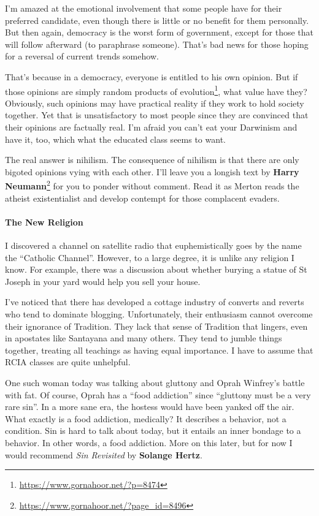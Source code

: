 I'm amazed at the emotional involvement that some people have for their preferred candidate, even though there is little or no benefit for them personally. But then again, democracy is the worst form of government, except for those that will follow afterward (to paraphrase someone). That's bad news for those hoping for a reversal of current trends somehow.

That's because in a democracy, everyone is entitled to his own opinion. But if those opinions are simply random products of evolution\footnote{\url{https://www.gornahoor.net/?p=8474}}, what value have they? Obviously, such opinions may have practical reality if they work to hold society together. Yet that is unsatisfactory to most people since they are convinced that their opinions are factually real. I'm afraid you can't eat your Darwinism and have it, too, which what the educated class seems to want.

The real answer is nihilism. The consequence of nihilism is that there are only bigoted opinions vying with each other. I'll leave you a longish text by \textbf{Harry Neumann}\footnote{\url{https://www.gornahoor.net/?page_id=8496}} for you to ponder without comment. Read it as Merton reads the atheist existentialist and develop contempt for those complacent evaders.

\paragraph{The New Religion}


I discovered a channel on satellite radio that euphemistically goes by the name the ``Catholic Channel''. However, to a large degree, it is unlike any religion I know. For example, there was a discussion about whether burying a statue of St Joseph in your yard would help you sell your house.

I've noticed that there has developed a cottage industry of converts and reverts who tend to dominate blogging. Unfortunately, their enthusiasm cannot overcome their ignorance of Tradition. They lack that sense of Tradition that lingers, even in apostates like Santayana and many others. They tend to jumble things together, treating all teachings as having equal importance. I have to assume that RCIA classes are quite unhelpful.

One such woman today was talking about gluttony and Oprah Winfrey's battle with fat. Of course, Oprah has a ``food addiction'' since ``gluttony must be a very rare sin''. In a more sane era, the hostess would have been yanked off the air. What exactly is a food addiction, medically? It describes a behavior, not a condition. Sin is hard to talk about today, but it entails an inner bondage to a behavior. In other words, a food addiction. More on this later, but for now I would recommend \emph{Sin Revisited} by \textbf{Solange Hertz}.

